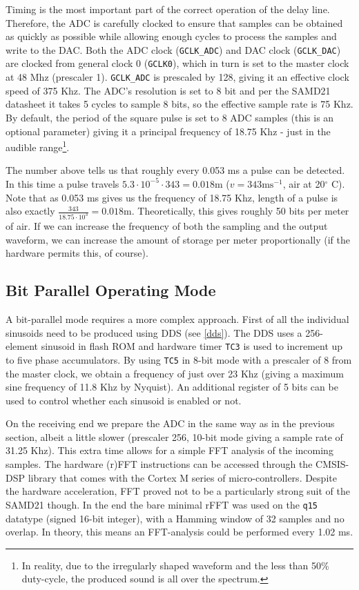 \documentclass[10pt,a4paper,twocolumn]{article}
\begin{document}
Timing is the most important part of the correct operation of the delay line. Therefore, the ADC is carefully clocked to ensure that samples can be obtained as quickly as possible while allowing enough cycles to process the samples and write to the DAC. Both the ADC clock (\texttt{GCLK\_ADC}) and DAC clock (\texttt{GCLK\_DAC}) are clocked from general clock 0 (\texttt{GCLK0}), which in turn is set to the master clock at 48 Mhz (prescaler 1). \texttt{GCLK\_ADC} is prescaled by 128, giving it an effective clock speed of 375 Khz. The ADC's resolution is set to 8 bit and per the SAMD21 datasheet it takes 5 cycles to sample 8 bits, so the effective sample rate is 75 Khz. By default, the period of the square pulse is set to 8 ADC samples (this is an optional parameter) giving it a principal frequency of 18.75 Khz - just in the audible range\footnote{In reality, due to the irregularly shaped waveform and the less than 50\% duty-cycle, the produced sound is all over the spectrum.}. 

The number above tells us that roughly every 0.053 ms a pulse can be detected. In this time a pulse travels $5.3\cdot10^{-5}\cdot343=0.018\mathrm{m}$ ($v=343\mathrm{ms}^{-1}$, air at 20$^{\circ}$ C). Note that as 0.053 ms gives us the frequency of 18.75 Khz, length of a pulse is also exactly $\frac{343}{18.75\cdot10^3}=0.018\mathrm{m}$. Theoretically, this gives roughly 50 bits per meter of air. If we can increase the frequency of both the sampling and the output waveform, we can increase the amount of storage per meter proportionally (if the hardware permits this, of course).

\subsection{Bit Parallel Operating Mode} 
A bit-parallel mode requires a more complex approach. First of all the individual sinusoids need to be produced using DDS (see \ref{dds}). The DDS uses a 256-element sinusoid in flash ROM and hardware timer \texttt{TC3} is used to increment up to five phase accumulators. By using \texttt{TC5} in 8-bit mode with a prescaler of 8 from the master clock, we obtain a frequency of just over 23 Khz (giving a maximum sine frequency of 11.8 Khz by Nyquist). An additional register of 5 bits can be used to control whether each sinusoid is enabled or not.

On the receiving end we prepare the ADC in the same way as in the previous section, albeit a little slower (prescaler 256, 10-bit mode giving a sample rate of 31.25 Khz). This extra time allows for a simple FFT analysis of the incoming samples. The hardware (r)FFT instructions can be accessed through the CMSIS-DSP library that comes with the Cortex M series of micro-controllers\cite{cmsis}. Despite the hardware acceleration, FFT proved not to be a particularly strong suit of the SAMD21 though. In the end the bare minimal rFFT was used on the \texttt{q15} datatype (signed 16-bit integer), with a Hamming window of 32 samples and no overlap. In theory, this means an FFT-analysis could be performed every 1.02 ms. 
\end{document}
